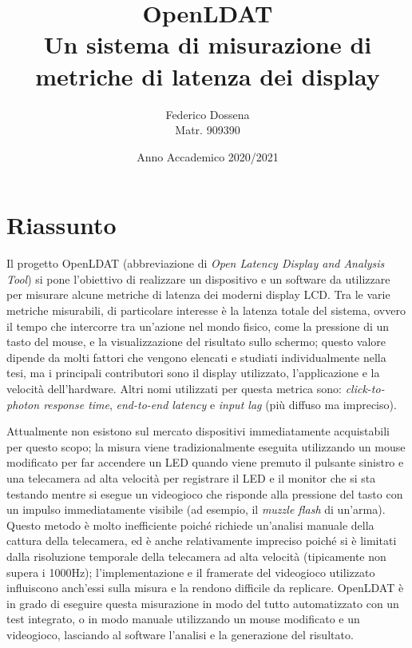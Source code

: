 \documentclass[a4paper]{article}
\title{OpenLDAT\\Un sistema di misurazione di metriche di latenza dei display}
\author{Federico Dossena\\Matr. 909390}
\date{Anno Accademico 2020/2021}
\begin{document}
\maketitle

\sloppy
\setlength{\parskip}{8pt}
\setlength{\parindent}{0pt}
\section*{Riassunto}
Il progetto OpenLDAT (abbreviazione di \textit{Open Latency Display and Analysis Tool}) si pone l'obiettivo di realizzare un dispositivo e un software da utilizzare per misurare alcune metriche di latenza dei moderni display LCD. Tra le varie metriche misurabili, di particolare interesse è la latenza totale del sistema, ovvero il tempo che intercorre tra un'azione nel mondo fisico, come la pressione di un tasto del mouse, e la visualizzazione del risultato sullo schermo; questo valore dipende da molti fattori che vengono elencati e studiati individualmente nella tesi, ma i principali contributori sono il display utilizzato, l'applicazione e la velocità dell'hardware. Altri nomi utilizzati per questa metrica sono: \textit{click-to-photon response time}, \textit{end-to-end latency} e \textit{input lag} (più diffuso ma impreciso).

Attualmente non esistono sul mercato dispositivi immediatamente acquistabili per questo scopo; la misura viene tradizionalmente eseguita utilizzando un mouse modificato per far accendere un LED quando viene premuto il pulsante sinistro e una telecamera ad alta velocità per registrare il LED e il monitor che si sta testando mentre si esegue un videogioco che risponde alla pressione del tasto con un impulso immediatamente visibile (ad esempio, il \textit{muzzle flash} di un'arma). Questo metodo è molto inefficiente poiché richiede un'analisi manuale della cattura della telecamera, ed è anche relativamente impreciso poiché si è limitati dalla risoluzione temporale della telecamera ad alta velocità (tipicamente non supera i 1000Hz); l'implementazione e il framerate del videogioco utilizzato influiscono anch'essi sulla misura e la rendono difficile da replicare. OpenLDAT è in grado di eseguire questa misurazione in modo del tutto automatizzato con un test integrato, o in modo manuale utilizzando un mouse modificato e un videogioco, lasciando al software l'analisi e la generazione del risultato.
\end{document}
